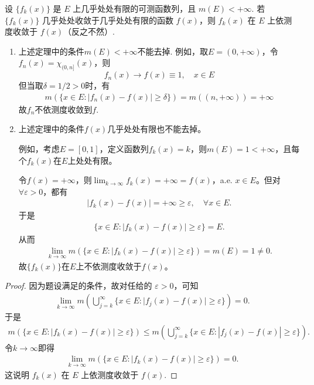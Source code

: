 \documentclass[../../main.tex]{subfiles}
\begin{document}
\begin{theorem}[Lebesgue定理]\label{theorem:几乎处处收敛在E的测度有限前提下必依测度收敛}
设 $\{f_k(x)\}$ 是 $E$ 上几乎处处有限的可测函数列，且 $m(E)<+\infty$. 若 $\{f_k(x)\}$ 几乎处处收敛于几乎处处有限的函数 $f(x)$，则 $f_k(x)$ 在 $E$ 上依测度收敛于 $f(x)$（反之不然）.
\end{theorem}
\begin{remark}
\begin{enumerate}
\item 上述定理中的条件\(m(E) < +\infty\)不能去掉. 例如，取\(E = (0, +\infty)\)，令\(f_n(x) = \chi_{(0,n]}(x)\)，则
\[f_n(x) \to f(x) \equiv 1, \quad x \in E\]
但当取\(\delta = 1/2 > 0\)时，有
\begin{align*}
m(\{x \in E : |f_n(x) - f(x)| \geqslant \delta\}) = m((n, +\infty)) = +\infty
\end{align*}
故\(f_n\)不依测度收敛到\(f\). 

\item 上述定理中的条件\(f(x)\)几乎处处有限也不能去掉。

例如，考虑\(E = [0, 1]\)，定义函数列\(f_k(x) = k\)，则\(m(E) = 1 < +\infty\)，且每个\(f_k(x)\)在\(E\)上处处有限。

令\(f(x) = +\infty\)，则\(\lim_{k \to \infty} f_k(x) = +\infty = f(x)\)，a.e. \(x \in E\)。但对\(\forall \varepsilon > 0\)，都有
\begin{align*}
|f_k(x) - f(x)| = +\infty \geqslant \varepsilon, \quad \forall x \in E.
\end{align*}
于是
\begin{align*}
\{x \in E : |f_k(x) - f(x)| \geqslant \varepsilon\} = E.
\end{align*}
从而
\begin{align*}
\lim_{k \to \infty} m(\{x \in E : |f_k(x) - f(x)| \geqslant \varepsilon\}) = m(E) = 1 \ne 0.
\end{align*}
故\(\{f_k(x)\}\)在\(E\)上不依测度收敛于\(f(x)\)。
\end{enumerate}
\end{remark}
\begin{proof}
因为题设满足的条件，故对任给的 $\varepsilon>0$，可知
\begin{align*}
\lim_{k\to\infty}m\left(\bigcup_{j = k}^{\infty}\{x\in E:\vert f_j(x)-f(x)\vert\geqslant\varepsilon\}\right)=0.
\end{align*}
于是
\begin{align*}
m(\{x\in E:\left| f_k(x)-f(x) \right|\geqslant \varepsilon \})\leqslant m\left( \bigcup_{j=k}^{\infty}{\{x}\in E:\left| f_j(x)-f(x) \right|\geqslant \varepsilon \} \right) .
\end{align*}
令$k\to \infty$即得
\begin{align*}
\lim_{k\to\infty}m(\{x\in E:\vert f_k(x)-f(x)\vert\geqslant\varepsilon\}) = 0.
\end{align*}
这说明 $f_k(x)$ 在 $E$ 上依测度收敛于 $f(x)$.

\end{proof}
\end{document}
